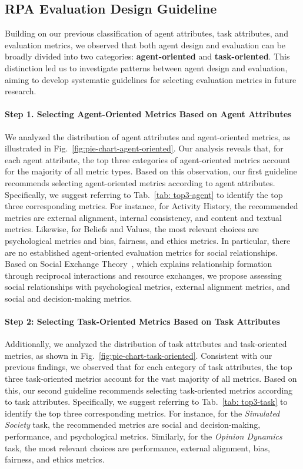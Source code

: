 \subsection{RPA Evaluation Design Guideline}
Building on our previous classification of agent attributes, task attributes, and evaluation metrics, we observed that both agent design and evaluation can be broadly divided into two categories: \textbf{agent-oriented} and \textbf{task-oriented}. This distinction led us to investigate patterns between agent design and evaluation, aiming to develop systematic guidelines for selecting evaluation metrics in future research.


\paragraph{Step 1. Selecting Agent-Oriented Metrics Based on Agent Attributes}
We analyzed the distribution of agent attributes and agent-oriented metrics, as illustrated in Fig.~\ref{fig:pie-chart-agent-oriented}. Our analysis reveals that, for each agent attribute, the top three categories of agent-oriented metrics account for the majority of all metric types. Based on this observation, our first guideline recommends selecting agent-oriented metrics according to agent attributes. Specifically, we suggest referring to Tab.~\ref{tab: top3-agent} to identify the top three corresponding metrics. For instance, for Activity History, the recommended metrics are external alignment, internal consistency, and content and textual metrics. Likewise, for Beliefs and Values, the most relevant choices are psychological metrics and bias, fairness, and ethics metrics.
In particular, there are no established agent-oriented evaluation metrics for social relationships. Based on Social Exchange Theory~\cite{cropanzano2005social}, which explains relationship formation through reciprocal interactions and resource exchanges, we propose assessing social relationships with psychological metrics, external alignment metrics, and social and decision-making metrics.

\paragraph{Step 2: Selecting Task-Oriented Metrics Based on Task Attributes}
Additionally, we analyzed the distribution of task attributes and task-oriented metrics, as shown in Fig.~\ref{fig:pie-chart-task-oriented}. Consistent with our previous findings, we observed that for each category of task attributes, the top three task-oriented metrics account for the vast majority of all metrics. Based on this, our second guideline recommends selecting task-oriented metrics according to task attributes. Specifically, we suggest referring to Tab.~\ref{tab: top3-task}  to identify the top three corresponding metrics. For instance, for the \textit{Simulated Society} task, the recommended metrics are social and decision-making, performance, and psychological metrics. Similarly, for the \textit{Opinion Dynamics} task, the most relevant choices are performance, external alignment, bias, fairness, and ethics metrics.

